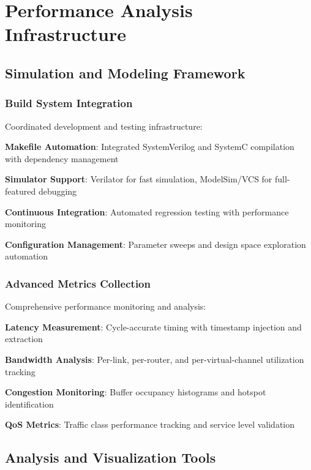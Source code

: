 \documentclass[11pt,a4paper]{article}
\begin{document}
\section{Performance Analysis Infrastructure}

\subsection{Simulation and Modeling Framework}

\subsubsection{Build System Integration}
Coordinated development and testing infrastructure:

\begin{techlist}
    \item \textbf{Makefile Automation}: Integrated SystemVerilog and SystemC compilation with dependency management
    \item \textbf{Simulator Support}: Verilator for fast simulation, ModelSim/VCS for full-featured debugging
    \item \textbf{Continuous Integration}: Automated regression testing with performance monitoring
    \item \textbf{Configuration Management}: Parameter sweeps and design space exploration automation
\end{techlist}

\subsubsection{Advanced Metrics Collection}
Comprehensive performance monitoring and analysis:

\begin{techlist}
    \item \textbf{Latency Measurement}: Cycle-accurate timing with timestamp injection and extraction
    \item \textbf{Bandwidth Analysis}: Per-link, per-router, and per-virtual-channel utilization tracking
    \item \textbf{Congestion Monitoring}: Buffer occupancy histograms and hotspot identification
    \item \textbf{QoS Metrics}: Traffic class performance tracking and service level validation
\end{techlist}

\subsection{Analysis and Visualization Tools}
\end{document}
